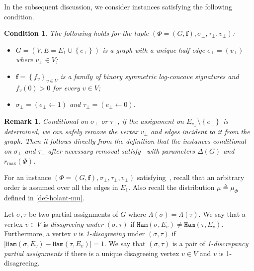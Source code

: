 \documentclass[11pt]{article}
\newtheorem*{remark}{Remark}
\newtheorem{condition}{Condition}
\newcommand{\abs}[1]{\left\vert#1\right\vert}
\newcommand{\set}[1]{\left\{#1\right\}}
\def\!#1{\mathtt{#1}}
\newcommand{\vecf}{\boldsymbol{f}}
\newcommand{\qgl}[1]{{\color{purple}{#1}}}
\begin{document}
In the subsequent discussion, we consider instances satisfying the following condition.
\begin{condition}\label{cond-instancepair}
    The following holds for the tuple $\left(\Phi = (G, \vecf),  \sigma_\bot, \tau_\bot,v_{\bot}\right)$:
    \begin{itemize}
		\item $G = (V, E = E_1 \cup \set{e_\bot})$ is a graph with a unique half edge $e_\bot = (v_{\bot})$ where $v_\bot \in V$;
		\item $\vecf = \set{f_v}_{v \in V}$ is a family of binary symmetric log-concave signatures and $f_v(0) > 0$ for every $v \in V$;
		\item $\sigma_\bot = (e_\bot \gets 1)$ and $\tau_\bot = (e_\bot \gets 0)$.
    \end{itemize}
\end{condition}
\begin{remark}
    Conditional on $\sigma_\bot$ or $\tau_\bot$, if the assignment on $E_{v_\bot} \setminus \set{e_\bot}$ is determined, we can safely remove the vertex $v_\bot$ and edges incident to it from the graph. Then it follows directly from the definition that the instances conditional on $\sigma_\bot$ and $\tau_\bot$ after necessary removal satisfy~ with parameters $\Delta(G)$ and $r_{\max}(\Phi)$.
\end{remark}
    
For an instance $(\Phi = (G, \vecf), \sigma_\bot, \tau_\bot, v_\bot)$ satisfying~, recall that an arbitrary order is assumed over all the edges in $E_1$.
Also recall the distribution $\mu \triangleq \mu_{\Phi}$ defined in \eqref{def-holant-mu}.
    
    Let $\sigma, \tau$ be two partial assignments of $G$ where $\Lambda(\sigma) = \Lambda(\tau)$.
    We say that a vertex $v \in V$ is \emph{disagreeing under $(\sigma, \tau)$} if ${\!{Ham}\left(\sigma,{E_v}\right)}\neq{\!{Ham}\left(\tau,{E_v}\right)}$. Furthermore, a vertex $v$ is \emph{1-disagreeing} under $(\sigma, \tau)$ if $\abs{{\!{Ham}\left(\sigma,{E_v}\right)}-{\!{Ham}\left(\tau,{E_v}\right)}}=1$.
    We say that $(\sigma, \tau)$ is a pair of \emph{1-discrepancy partial assignments} if there is a unique disagreeing vertex $v \in V$ and $v$ is 1-disagreeing.
\end{document}
